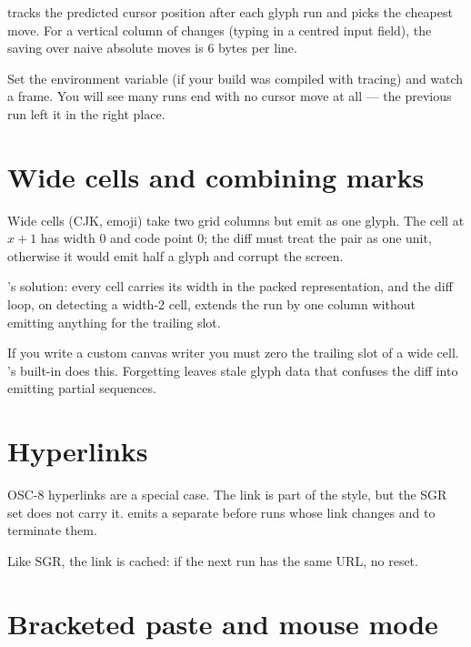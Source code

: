 \maya{} tracks the predicted cursor position after each glyph run
and picks the cheapest move. For a vertical column of changes
(typing in a centred input field), the saving over naive absolute
moves is 6 bytes per line.

\begin{tryit}
Set the environment variable  (if your
build was compiled with tracing) and watch a frame. You will see
many runs end with no cursor move at all --- the previous run
left it in the right place.
\end{tryit}

\section{Wide cells and combining marks}

Wide cells (CJK, emoji) take two grid columns but emit as one
glyph. The cell at $x+1$ has width 0 and code point 0; the diff
must treat the pair as one unit, otherwise it would emit half a
glyph and corrupt the screen.

\maya{}'s solution: every cell carries its width in the packed
representation, and the diff loop, on detecting a width-2 cell,
extends the run by one column without emitting anything for the
trailing slot.

\begin{warning}
If you write a custom canvas writer you must zero the trailing
slot of a wide cell. \maya{}'s built-in  does this.
Forgetting leaves stale glyph data that confuses the diff into
emitting partial sequences.
\end{warning}

\section{Hyperlinks}

OSC-8 hyperlinks are a special case. The link is part of the
style, but the SGR set does not carry it. \maya{} emits a
separate \code{ESC ] 8 ; ; URL \char`\\7} before runs whose link
changes and \code{ESC ] 8 ; ; \char`\\7} to terminate them.

Like SGR, the link is cached: if the next run has the same URL,
no reset.

\section{Bracketed paste and mouse mode}


